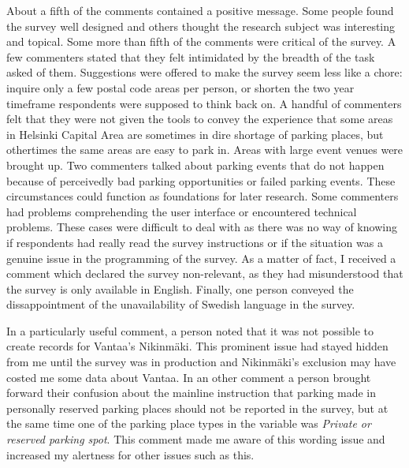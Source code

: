 About a fifth of the comments contained a positive message. Some people found the survey well designed and others thought the research subject was interesting and topical. Some more than fifth of the comments were critical of the survey. A few commenters stated that they felt intimidated by the breadth of the task asked of them. Suggestions were offered to make the survey seem less like a chore: inquire only a few postal code areas per person, or shorten the two year timeframe respondents were supposed to think back on. A handful of commenters felt that they were not given the tools to convey the experience that some areas in Helsinki Capital Area are sometimes in dire shortage of parking places, but othertimes the same areas are easy to park in. Areas with large event venues were brought up. Two commenters talked about parking events that do not happen because of perceivedly bad parking opportunities or failed parking events. These circumstances could function as foundations for later research. Some commenters had problems comprehending the user interface or encountered technical problems. These cases were difficult to deal with as there was no way of knowing if respondents had really read the survey instructions or if the situation was a genuine issue in the programming of the survey. As a matter of fact, I received a comment which declared the survey non-relevant, as they had misunderstood that the survey is only available in English. Finally, one person conveyed the dissappointment of the unavailability of Swedish language in the survey.

In a particularly useful comment, a person noted that it was not possible to create records for Vantaa's Nikinmäki. This prominent issue had stayed hidden from me until the survey was in production and Nikinmäki's exclusion may have costed me some data about Vantaa. In an other comment a person brought forward their confusion about the mainline instruction that parking made in personally reserved parking places should not be reported in the survey, but at the same time one of the parking place types in the variable  was \textit{Private or reserved parking spot}. This comment made me aware of this wording issue and increased my alertness for other issues such as this.

